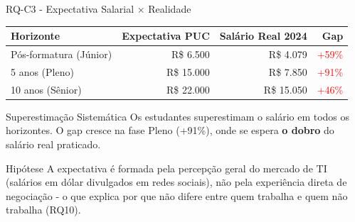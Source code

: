 \documentclass[fleqn]{beamer}
\begin{document}
\begin{frame}{RQ-C3 - Expectativa Salarial × Realidade}
\begin{table}[H]
\centering
\scriptsize
\begin{tabular}{lrrr}
\toprule
\textbf{Horizonte} & \textbf{Expectativa PUC} & \textbf{Salário Real 2024} & \textbf{Gap} \\
\midrule
Pós-formatura (Júnior) & R\$ 6.500 & R\$ 4.079 & \textcolor{red}{+59\%} \\
5 anos (Pleno) & R\$ 15.000 & R\$ 7.850 & \textcolor{red}{+91\%} \\
10 anos (Sênior) & R\$ 22.000 & R\$ 15.050 & \textcolor{red}{+46\%} \\
\bottomrule
\end{tabular}
\end{table}

\begin{alertblock}{Superestimação Sistemática}
Os estudantes superestimam o salário em todos os horizontes. O gap cresce na fase Pleno (+91\%), onde se espera \textbf{o dobro} do salário real praticado.
\end{alertblock}

\begin{block}{Hipótese}
A expectativa é formada pela percepção geral do mercado de TI (salários em dólar divulgados em redes sociais), não pela experiência direta de negociação - o que explica por que não difere entre quem trabalha e quem não trabalha (RQ10).
\end{block}
\end{frame}
\end{document}
